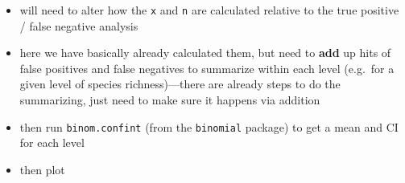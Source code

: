 \documentclass[
]{article}
\providecommand{\tightlist}{%
  \setlength{\itemsep}{0pt}\setlength{\parskip}{0pt}}
\begin{document}
\begin{itemize}
\tightlist
\item
  will need to alter how the \texttt{x} and \texttt{n} are calculated
  relative to the true positive / false negative analysis
\item
  here we have basically already calculated them, but need to
  \textbf{add} up hits of false positives and false negatives to
  summarize within each level (e.g.~for a given level of species
  richness)---there are already steps to do the summarizing, just need
  to make sure it happens via addition
\item
  then run \texttt{binom.confint} (from the \texttt{binomial} package)
  to get a mean and CI for each level
\item
  then plot
\end{itemize}
\end{document}
